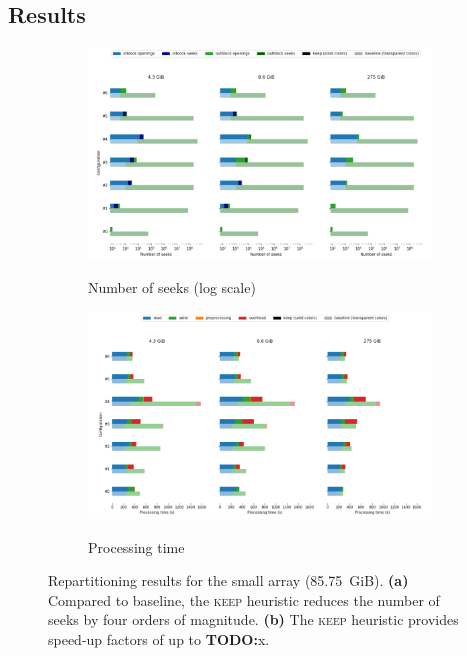 \documentclass[sigconf, nonacm]{acmart}
\newcommand{\todo}[1]{\color{red}\textbf{TODO:}#1\color{black}}
\newcommand{\keep}[0]{\textsc{keep}\xspace}
\begin{document}
\subsection{Results}

\begin{figure}
  \centering
  \begin{subfigure}{\textwidth}
    \caption{Number of seeks (log scale)}
    \includegraphics[scale=0.45]{./figures/seeks_3500.png}
    \label{fig:seeks_3500}
  \end{subfigure}
  \begin{subfigure}{\textwidth}
    \caption{Processing time}
   \includegraphics[scale=0.45]{./figures/time_3500.png}
  \label{fig:time_3500}
  \end{subfigure}
  \caption{Repartitioning results for the small array (85.75~GiB). \textbf{(a)} Compared to baseline, the \keep heuristic
  reduces the number of seeks by four orders of magnitude. \textbf{(b)} The \keep heuristic provides speed-up factors of up to \todo{x}.}
  \label{fig:3500}
\end{figure}
\end{document}
